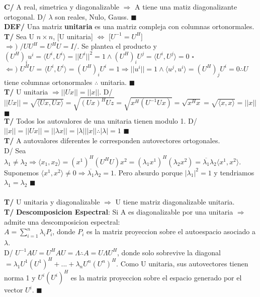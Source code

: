 \documentclass[10pt,a4paper]{article}
\newcommand*{\QEDA}{\null\nobreak\hfill\ensuremath{\blacksquare}}
\newcommand*{\QEDB}{\null\nobreak\hfill\ensuremath{\square}}
\begin{document}
\textbf{C/} A real, simetrica y diagonalizable $\Rightarrow$ A tiene una matiz diagonalizante ortogonal. D/ $\lambda$ son reales, Nulo, Gauss. \QEDA\\
\textbf{DEF/} Una matriz \textbf{unitaria} es una matriz compleja con columnas ortonormales.\\
\textbf{T/} Sea U $n \times n$, [U unitaria] $\iff$ [$U^{-1}=U^H$]\\
$\Rightarrow)$ $/UU^H=U^HU=I/$. Se plantea el producto y $(U^H)_iu^i = \langle U^i,U^i \rangle = ||U^i||^2 = 1 \land (U^H)_iU^j = \langle U^i,U^j \rangle = 0$ \QEDB\\
$\Leftarrow)$ $U^HU$ = $\langle U^i,U^i \rangle = (U^H)_iU^i = 1 \Rightarrow ||u^i|| = 1 \land \langle u^j,u^i \rangle = (U^H)_jU^i = 0 \therefore U$ tiene columnas ortonormales $\therefore$ unitaria. \QEDA\\
\textbf{T/} U unitaria $\Rightarrow ||Ux||=||x||$. D/ $||Ux|| = \sqrt{\langle Ux,Ux \rangle} = \sqrt{(Ux)^HUz} = \sqrt{x^H(U^{-1}Ux)} = \sqrt{x^Hx} = \sqrt{\langle x,x \rangle} = ||x||$ \QEDA\\
\textbf{T/} Todos los autovalores de una unitaria tienen modulo 1. D/ $||x||=||Ux||=||\lambda x|| = |\lambda|||x|| \therefore |\lambda|=1$ \QEDA\\
\textbf{T/} A autovalores diferentes le corresponden autovectores ortogonales.\\
D/ Sea $\lambda_1\not=\lambda_2 \Rightarrow \langle x_1,x_2 \rangle = (x^1)^H(U^HU)x^2 = (\lambda_1x^1)^H(\lambda_2x^2) = \overline{\lambda_1}\lambda_2\langle x^1,x^2 \rangle$. Suponemos $\langle x^1,x^2 \rangle\not=0 \Rightarrow \overline{\lambda_1}\lambda_2=1$. Pero absurdo porque $|\lambda_1|^2 = 1$ y tendriamos $\lambda_1=\lambda_2$ \QEDA\\\\
\textbf{T/} U unitaria y diagonalizable $\Rightarrow$ U tiene matriz diagonalizable unitaria.\\
\textbf{T/} \textbf{Descomposicion Espectral}: Si A es diagonalizable por una unitaria $\Rightarrow$ admite una descomposicion espectral:\\ $A = \sum_{i=1}^n \lambda_iP_i$, donde $P_i$ es la matriz proyeccion sobre el autoespacio asociado a $\lambda$.\\
D/ $U^{-1}AU=U^HAU=\Lambda \therefore A=U\Lambda U^H$, donde solo sobrevive la diagonal $=\lambda_1U^1(U^1)^H + ... + \lambda_nU^n(U^n)^H$. Como U unitaria, sus autovectores tienen norma 1 y $U^i(U^i)^H$ es la matriz proyeccion sobre el espacio generado por el vector $U^i$. \QEDA\\
\end{document}
